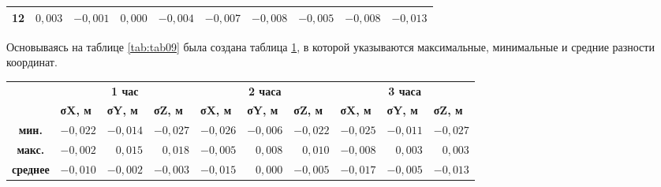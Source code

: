 \begin{table} [htbp]
{\begin{tabular}{|c|rrr|rrr|rrr|}
			\textbf{12}                 & 
			\multicolumn{1}{r|}{$ 0,003$}       & \multicolumn{1}{r|}{$-0,001$}       & $ 0,000$                            & \multicolumn{1}{r|}{$-0,004$}       & \multicolumn{1}{r|}{$-0,007$}       & $-0,008$                            & \multicolumn{1}{r|}{$-0,005$}       & \multicolumn{1}{r|}{$-0,008$}       & $-0,013$                            \\ \hline
		\end{tabular}
	}
\end{table}

Основываясь на таблице \cref{tab:tab09} была создана таблица \cref{tab:tab10}, в которой указываются максимальные, минимальные и средние разности координат.


\begin{table} [htbp]
	\centering\small
	\label{tab:tab10}{%
		\begin{tabular}{|c|rrr|rrr|rrr|}
			\hline
			\multirow{2}{*}{\textbf{ }} & 
			\multicolumn{3}{c|}{\textbf{1 час}}  & \multicolumn{3}{c|}{\textbf{2 часа}}  & \multicolumn{3}{c|}{\textbf{3 часа}}  \\ \cline{2-10} & 
			\multicolumn{1}{l|}{\textbf{σX, м}} & \multicolumn{1}{l|}{\textbf{σY, м}} & \multicolumn{1}{l|}{\textbf{σZ, м}} & \multicolumn{1}{l|}{\textbf{σX, м}} & \multicolumn{1}{l|}{\textbf{σY, м}} & \multicolumn{1}{l|}{\textbf{σZ, м}} & \multicolumn{1}{l|}{\textbf{σX, м}} & \multicolumn{1}{l|}{\textbf{σY, м}} & \multicolumn{1}{l|}{\textbf{σZ, м}} \\ \hline
			\textbf{мин.}                    & 
			\multicolumn{1}{r|}{$-0,022$}       & \multicolumn{1}{r|}{$-0,014$}         & $-0,027$                            & \multicolumn{1}{r|}{$-0,026$}       & \multicolumn{1}{r|}{$-0,006$}         & $-0,022$                            & \multicolumn{1}{r|}{$-0,025$}       & \multicolumn{1}{r|}{$-0,011$}         & $-0,027$                            \\ \hline
			\textbf{макс.}                   & 
			\multicolumn{1}{r|}{$-0,002$}       & \multicolumn{1}{r|}{$ 0,015$}         & $ 0,018$                            & \multicolumn{1}{r|}{$-0,005$}       & \multicolumn{1}{r|}{$ 0,008$}         & $ 0,010$                            & \multicolumn{1}{r|}{$-0,008$}       & \multicolumn{1}{r|}{$ 0,003$}         & $ 0,003$                            \\ \hline
			\textbf{среднее}                    & 
			\multicolumn{1}{r|}{$-0,010$}       & \multicolumn{1}{r|}{$-0,002$}         & $-0,003$                            & \multicolumn{1}{r|}{$-0,015$}       & \multicolumn{1}{r|}{$ 0,000$}         & $-0,005$                            & \multicolumn{1}{r|}{$-0,017$}       & \multicolumn{1}{r|}{$-0,005$}         & $-0,013$                            \\ \hline
		\end{tabular}
	}
\end{table}



